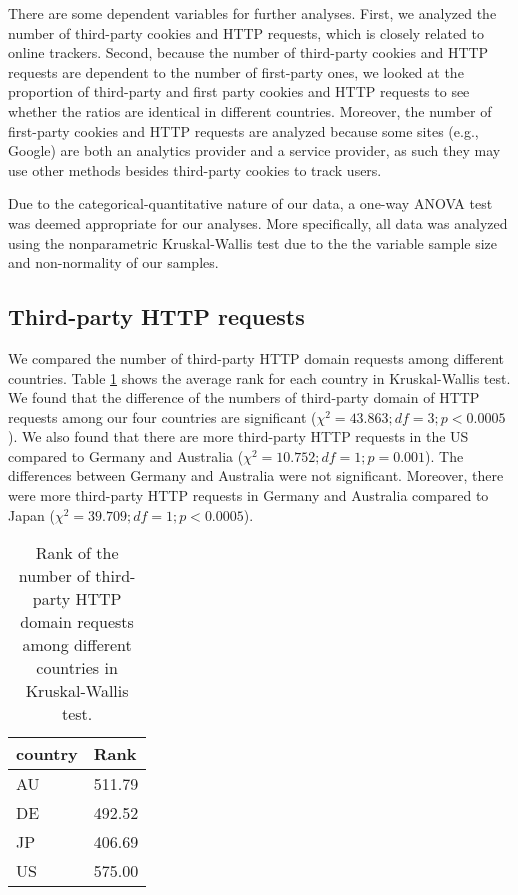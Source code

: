 \documentclass[conference]{IEEEtran}
\begin{document}
There are some dependent variables for further analyses. First, we analyzed the number of third-party cookies and HTTP requests, which is closely related to online trackers. Second, because the number of third-party cookies and HTTP requests are dependent to the number of first-party ones, we looked at the proportion of third-party and first party cookies and HTTP requests to see whether the ratios are identical in different countries. Moreover, the number of first-party cookies and HTTP requests are analyzed because some sites (e.g., Google) are both an analytics provider and a service provider, as such they may use other methods besides third-party cookies to track users. 

Due to the categorical-quantitative nature of our data, a one-way ANOVA test was deemed appropriate for our analyses. More specifically, all data was analyzed using the nonparametric Kruskal-Wallis test due to the the variable sample size and non-normality of our samples.

\subsection{Third-party HTTP requests}
We compared the number of third-party HTTP domain requests among different countries. 
Table \ref{thirdHTTP} shows the average rank for each country in Kruskal-Wallis test. We found that the difference of the numbers of third-party domain of HTTP requests among our four countries are significant ($\chi^{2} = 43.863; df = 3; p < 0.0005$). We also found that there are more third-party HTTP requests in the US compared to Germany and Australia ($\chi^{2} =10.752; df=1; p=0.001$). The differences between Germany and Australia were not significant. Moreover, there were more third-party HTTP requests in Germany and Australia compared to Japan ($\chi^{2} =39.709; df=1; p<0.0005$).

\begin{table}[t]
\centering
\caption{Rank of the number of third-party HTTP domain requests among different countries in Kruskal-Wallis test.}
\label{thirdHTTP}
\begin{tabular}{|l|l|}
\hline
\textbf{country} & \textbf{Rank} \\ \hline
AU               & 511.79        \\ \hline
DE               & 492.52        \\ \hline
JP               & 406.69        \\ \hline
US               & 575.00        \\ \hline
\end{tabular}
\end{table}
\end{document}
